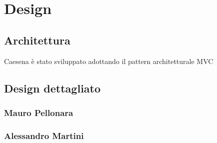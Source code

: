 \section{Design}
\subsection{Architettura}
Caesena è stato sviluppato adottando il pattern architetturale MVC 
\subsection{Design dettagliato}

\subsubsection*{Mauro Pellonara} 

\subsubsection*{Alessandro Martini}

